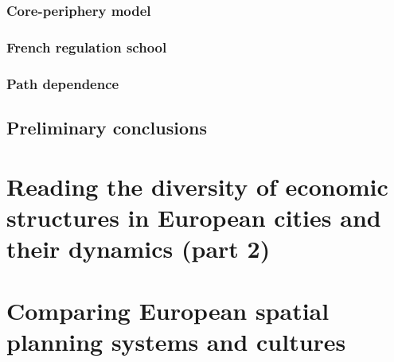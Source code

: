 \documentclass{article}
\begin{document}
\begin{outline}
	\1
\end{outline}


\subsubsection{Core-periphery model}


\begin{outline}
	\1
\end{outline}

\subsubsection{French regulation school}


\begin{outline}
	\1
\end{outline}

\subsubsection{Path dependence}


\begin{outline}
	\1
\end{outline}

\subsection{Preliminary conclusions}





\section{Reading the diversity of economic structures in European cities and their dynamics (part 2)}
\date{October 25th, 2021}


\section{Comparing European spatial planning systems and cultures}
\date{November 8th, 2021}


\end{document}
